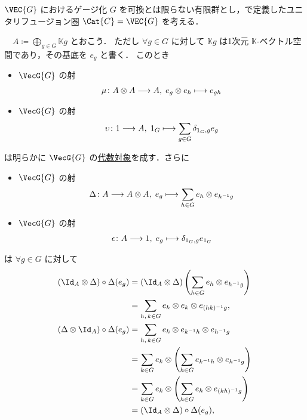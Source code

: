\documentclass[TQFT_main]{subfiles}
\begin{document}
\begin{myexample}[label=ex:gaiging-VecG]{$\VEC{G}$ におけるゲージ化}
$G$ を可換とは限らない有限群とし，で定義したユニタリフュージョン圏 $\Cat{C} = \VEC{G}$ を考える．

　$A \coloneqq \bigoplus_{g \in G} \mathbb{K} g$ とおこう．
ただし $\forall g \in G$ に対して $\mathbb{K} g$ は1次元 $\mathbb{K}$-ベクトル空間であり，その基底を $e_g$ と書く．
このとき
\begin{itemize}
    \item $\VecG{G}$ の射
    \begin{align}
        \mu \colon A \otimes A \longrightarrow A,\; e_g \otimes e_h \longmapsto e_{gh}
    \end{align}
    \item $\VecG{G}$ の射
    \begin{align}
        \upsilon \colon 1 \longrightarrow A,\; 1_G \longmapsto \sum_{g \in G} \delta_{1_G,g} e_g
    \end{align}
\end{itemize}
は明らかに $\VecG{G}$ の\hyperref[def:algobj]{代数対象}を成す．さらに
\begin{itemize}
    \item $\VecG{G}$ の射
    \begin{align}
        \Delta \colon A \longrightarrow A \otimes A,\; e_g \longmapsto \sum_{h \in G} e_h \otimes e_{h^{-1}g}
    \end{align}
    \item $\VecG{G}$ の射
    \begin{align}
        \epsilon \colon A \longrightarrow 1,\; e_g \longmapsto \delta_{1_G,g} e_{1_G}
    \end{align}
\end{itemize}
は $\forall g \in G$ に対して
\begin{align}
    (\Id_A \otimes \Delta) \circ \Delta (e_g) 
    &= (\Id_A \otimes \Delta) \left(\sum_{h \in G} e_h \otimes e_{h^{-1}g}\right) \\
    &= \sum_{h,\, k \in G} e_h \otimes e_{k} \otimes e_{(hk)^{-1} g}, \\
    (\Delta \otimes \Id_A) \circ \Delta (e_g) 
    &= \sum_{h,\, k \in G} e_k \otimes e_{k^{-1} h} \otimes e_{h^{-1} g} \\
    &= \sum_{k \in G} e_k \otimes \left(\sum_{h \in G} e_{k^{-1} h} \otimes e_{h^{-1} g}\right) \\
    &= \sum_{k \in G} e_k \otimes \left(\sum_{h \in G} e_{h} \otimes e_{(kh)^{-1} g}\right) \\
    &= (\Id_A \otimes \Delta) \circ \Delta (e_g), \\

\end{align}
\end{myexample}
\end{document}
